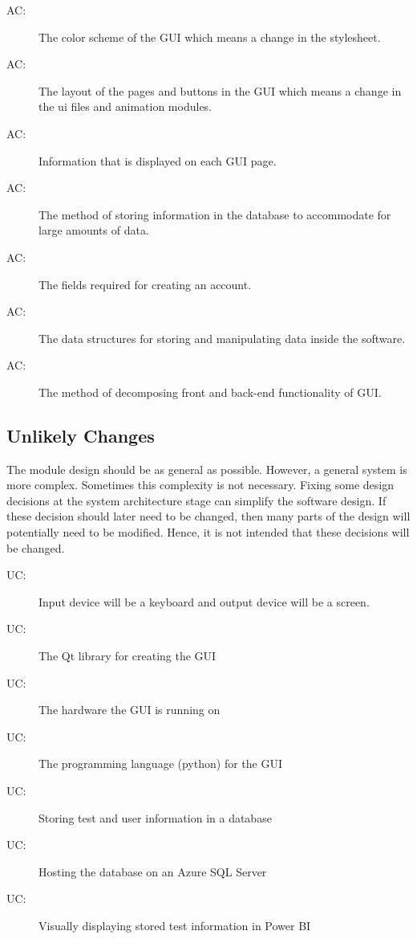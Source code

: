 \documentclass[12pt, titlepage]{article}
\newcounter{acnum}
\newcommand{\actheacnum}{AC\theacnum}
\newcounter{ucnum}
\newcommand{\uctheucnum}{UC\theucnum}
\begin{document}
\begin{description}
\item[ \actheacnum \label{acHardware}:] The color scheme of the GUI which means a change in the stylesheet.
\item[ \actheacnum \label{acInput}:] The layout of the pages and buttons in the GUI which means a change in the ui files and animation modules.
\item[ \actheacnum \label{acGuiInfo}:] Information that is displayed on each GUI page.
\item[ \actheacnum \label{acDbStoring}:] The method of storing information in the database to accommodate for large amounts of data.
\item[ \actheacnum \label{acAccountFields}:] The fields required for creating an account.
\item[ \actheacnum \label{acDataStructures}:] The data structures for storing and manipulating data inside the software.
\item[ \actheacnum \label{acBackendFrontend}:] The method of decomposing front and back-end functionality of GUI.
\end{description}

\subsection{Unlikely Changes} \label{SecUchange}

The module design should be as general as possible. However, a general system is
more complex. Sometimes this complexity is not necessary. Fixing some design
decisions at the system architecture stage can simplify the software design. If
these decision should later need to be changed, then many parts of the design
will potentially need to be modified. Hence, it is not intended that these
decisions will be changed.

\begin{description}
\item[ \uctheucnum \label{ucIO}:] Input device will be a keyboard and output device will be a screen. 
\item[ \uctheucnum \label{ucQt}:] The Qt library for creating the GUI
\item[ \uctheucnum \label{ucHardware}:] The hardware the GUI is running on
\item[ \uctheucnum \label{ucPython}:] The programming language (python) for the GUI
\item[ \uctheucnum \label{ucStoringUser}:] Storing test and user information in a database
\item[ \uctheucnum \label{ucAzure}:] Hosting the database on an Azure SQL Server
\item[ \uctheucnum \label{ucPowerBi}:] Visually displaying stored test information in Power BI
\end{description}
\end{document}

